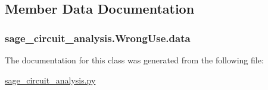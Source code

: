 \subsection{Member Data Documentation}
\hypertarget{classsage__circuit__analysis_1_1WrongUse_a8e72fd123c497662fb4e9d69380cf6c7}{
\subsubsection[{data}]{\setlength{\rightskip}{0pt plus 5cm}sage\-\_\-circuit\-\_\-analysis.\-Wrong\-Use.\-data}}\label{classsage__circuit__analysis_1_1WrongUse_a8e72fd123c497662fb4e9d69380cf6c7}


The documentation for this class was generated from the following file\-:\begin{DoxyCompactItemize}
\item 
\hyperlink{sage__circuit__analysis_8py}{sage\-\_\-circuit\-\_\-analysis.\-py}\end{DoxyCompactItemize}
